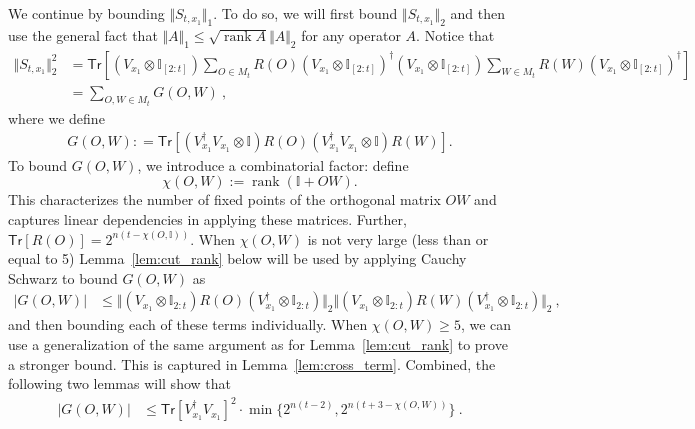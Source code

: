 \documentclass[11pt]{article}
\newcommand{\id}{\ensuremath{\mathbb{I}}}
\newcommand{\Tr}{\mathsf{Tr}}
\DeclareMathOperator{\rank}{rank}
\begin{document}
We continue by bounding $\Vert S_{t,x_1}\Vert_1$. To do so, we will first bound $\Vert S_{t,x_1}\Vert_2$ and then use the general fact that $\Vert A\Vert_1 \leq \sqrt{\rank A}\Vert A \Vert_2$ for any operator $A$. Notice that
\begin{align}
    \Vert S_{t,x_1}\Vert_2^2 & = \Tr\left[ (V_{x_1}\otimes \id_{[2:t]}) \sum_{O \in M_t} R(O) (V_{x_1}\otimes \id_{[2:t]})^\dagger (V_{x_1}\otimes \id_{[2:t]}) \sum_{W \in M_t}R(W) (V_{x_1}\otimes \id_{[2:t]})^\dagger  \right]\\
    & = \sum_{O,W\in M_t}G(O,W)\ , 
\end{align}
where we define
\begin{align}
    G(O,W) : = \Tr[(V_{x_1}^\dagger V_{x_1} \otimes \id)R(O) (V_{x_1}^\dagger V_{x_1} \otimes \id) R(W)].
\end{align}
To bound $G(O,W)$, we introduce a combinatorial factor: define 
$$
\chi(O,W) := \rank(\id+OW).
$$
This characterizes the number of fixed points of the orthogonal matrix $OW$ and captures linear dependencies in applying these matrices. Further, $\Tr[R(O)]  = 2^{n(t-\chi(O,\id))}$. When $\chi(O,W)$ is not very large (less than or equal to 5) Lemma~\ref{lem:cut_rank} below will be used by applying Cauchy Schwarz to bound $G(O,W)$ as
\begin{align}
    \vert G(O,W)\vert & \leq \Vert (V_{x_1} \otimes \id_{2:t}) R(O) (V_{x_1}^\dagger \otimes \id_{2:t}) \Vert_2 \Vert (V_{x_1} \otimes \id_{2:t}) R(W) (V_{x_1}^\dagger \otimes \id_{2:t}) \Vert_2 \ ,
\end{align}
and then bounding each of these terms individually. When $\chi(O,W) \geq 5$, we can use a generalization of the same argument as for Lemma~\ref{lem:cut_rank} to prove a stronger bound. This is captured in Lemma~\ref{lem:cross_term}. Combined, the following two lemmas will show that
\begin{align}
    \vert G(O,W)\vert & \leq \Tr[V_{x_1}^\dagger V_{x_1}]^2\cdot \min\{ 2^{n(t-2)}, 2^{n(t+3-\chi(O,W))} \}\ .
\end{align}
\end{document}
